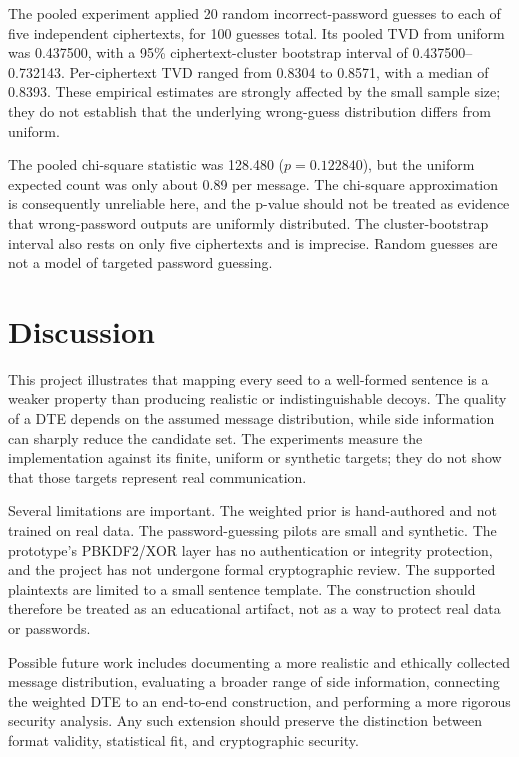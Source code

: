 \documentclass[sigconf,nonacm]{acmart}
\begin{document}
The pooled experiment applied 20 random incorrect-password guesses to each
of five independent ciphertexts, for 100 guesses total. Its pooled TVD from
uniform was 0.437500, with a 95\% ciphertext-cluster bootstrap interval of
0.437500--0.732143. Per-ciphertext TVD ranged from 0.8304 to 0.8571, with a
median of 0.8393. These empirical estimates are strongly affected by the
small sample size; they do not establish that the underlying wrong-guess
distribution differs from uniform.

The pooled chi-square statistic was 128.480 ($p=0.122840$), but the uniform
expected count was only about 0.89 per message. The chi-square approximation
is consequently unreliable here, and the p-value should not be treated as
evidence that wrong-password outputs are uniformly distributed. The
cluster-bootstrap interval also rests on only five ciphertexts and is
imprecise. Random guesses are not a model of targeted password guessing.

\section{Discussion}
\label{sec:discussion}

This project illustrates that mapping every seed to a well-formed sentence
is a weaker property than producing realistic or indistinguishable decoys.
The quality of a DTE depends on the assumed message distribution, while
side information can sharply reduce the candidate set. The experiments
measure the implementation against its finite, uniform or synthetic targets;
they do not show that those targets represent real communication.

Several limitations are important. The weighted prior is hand-authored and
not trained on real data. The password-guessing pilots are small and
synthetic. The prototype's PBKDF2/XOR layer has no authentication or
integrity protection, and the project has not undergone formal cryptographic
review. The supported plaintexts are limited to a small sentence template.
The construction should therefore be treated as an educational artifact,
not as a way to protect real data or passwords.

Possible future work includes documenting a more realistic and ethically
collected message distribution, evaluating a broader range of side
information, connecting the weighted DTE to an end-to-end construction, and
performing a more rigorous security analysis. Any such extension should
preserve the distinction between format validity, statistical fit, and
cryptographic security.



\end{document}
